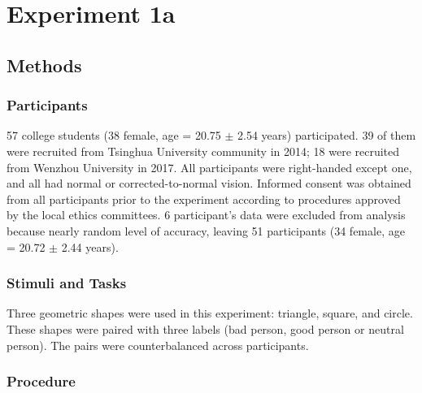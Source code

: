 \documentclass[man]{apa6}
\begin{document}
\hypertarget{experiment-1a}{%
\section{Experiment 1a}\label{experiment-1a}}

\hypertarget{methods}{%
\subsection{Methods}\label{methods}}

\hypertarget{participants}{%
\subsubsection{Participants}\label{participants}}

57 college students (38 female, age = 20.75 \(\pm\) 2.54 years) participated. 39 of them were recruited from Tsinghua University community in 2014; 18 were recruited from Wenzhou University in 2017. All participants were right-handed except one, and all had normal or corrected-to-normal vision. Informed consent was obtained from all participants prior to the experiment according to procedures approved by the local ethics committees. 6 participant's data were excluded from analysis because nearly random level of accuracy, leaving 51 participants (34 female, age = 20.72 \(\pm\) 2.44 years).

\hypertarget{stimuli-and-tasks}{%
\subsubsection{Stimuli and Tasks}\label{stimuli-and-tasks}}

Three geometric shapes were used in this experiment: triangle, square, and circle. These shapes were paired with three labels (bad person, good person or neutral person). The pairs were counterbalanced across participants.

\hypertarget{procedure}{%
\subsubsection{Procedure}\label{procedure}}
\end{document}
